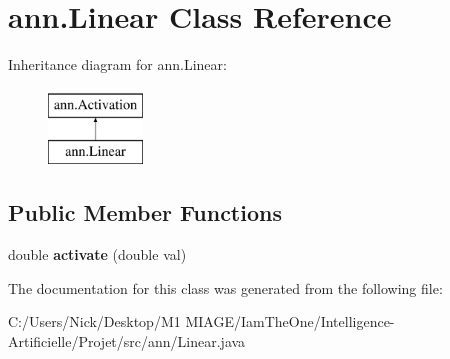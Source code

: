 \hypertarget{classann_1_1_linear}{}\section{ann.\+Linear Class Reference}
\label{classann_1_1_linear}
Inheritance diagram for ann.\+Linear\+:\begin{figure}[H]
\begin{center}
\leavevmode
\includegraphics[height=2.000000cm]{classann_1_1_linear}
\end{center}
\end{figure}
\subsection*{Public Member Functions}
\begin{DoxyCompactItemize}
\item 
\mbox{\label{classann_1_1_linear_ae68f09cd9d9fc93ac9c00f61730b82fb}} 
double {\bfseries activate} (double val)
\end{DoxyCompactItemize}


The documentation for this class was generated from the following file\+:\begin{DoxyCompactItemize}
\item 
C\+:/\+Users/\+Nick/\+Desktop/\+M1 M\+I\+A\+G\+E/\+Iam\+The\+One/\+Intelligence-\/\+Artificielle/\+Projet/src/ann/Linear.\+java\end{DoxyCompactItemize}
